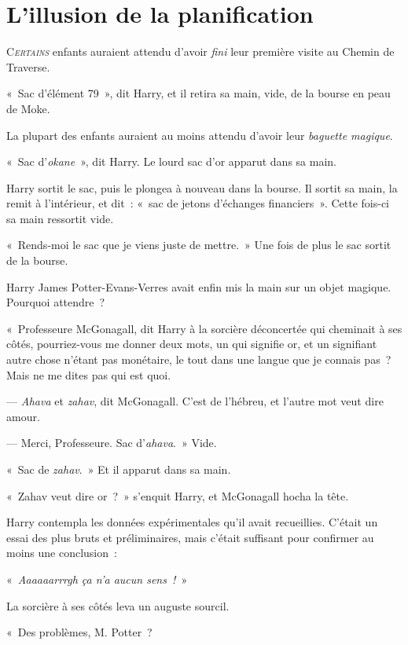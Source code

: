 \chapter{L'illusion de la planification}

\lettrine{C}{\emph{ertains}} enfants auraient attendu d'avoir \emph{fini} leur première visite au Chemin de Traverse.

«~Sac d'élément 79~», dit Harry, et il retira sa main, vide, de la bourse en peau de Moke.

La plupart des enfants auraient au moins attendu d'avoir leur \emph{baguette magique}.

«~Sac d'\emph{okane}~», dit Harry. Le lourd sac d'or apparut dans sa main.

Harry sortit le sac, puis le plongea à nouveau dans la bourse. Il sortit sa main, la remit à l'intérieur, et dit~: «~sac de jetons d'échanges financiers~». Cette fois-ci sa main ressortit vide.

«~Rends-moi le sac que je viens juste de mettre.~» Une fois de plus le sac sortit de la bourse.

Harry James Potter-Evans-Verres avait enfin mis la main sur un objet magique. Pourquoi attendre~?

«~Professeure McGonagall, dit Harry à la sorcière déconcertée qui cheminait à ses côtés, pourriez-vous me donner deux mots, un qui signifie or, et un signifiant autre chose n'étant pas monétaire, le tout dans une langue que je connais pas~? Mais ne me dites pas qui est quoi.

--- \emph{Ahava} et \emph{zahav}, dit McGonagall. C'est de l'hébreu, et l'autre mot veut dire amour.

--- Merci, Professeure. Sac d'\emph{ahava}.~» Vide.

«~Sac de \emph{zahav}.~» Et il apparut dans sa main.

«~Zahav veut dire or~?~» s'enquit Harry, et McGonagall hocha la tête.

Harry contempla les données expérimentales qu'il avait recueillies.
C'était un essai des plus bruts et préliminaires, mais c'était suffisant pour confirmer au moins une conclusion~:

«~\emph{Aaaaaarrrgh ça n'a aucun sens~!}~»

La sorcière à ses côtés leva un auguste sourcil.

«~Des problèmes, M. Potter~?

